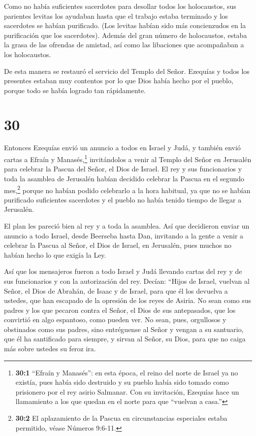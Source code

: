  Como no había suficientes sacerdotes para desollar todos
los holocaustos, sus parientes levitas los ayudaban hasta que el trabajo
estaba terminado y los sacerdotes se habían purificado. (Los levitas
habían sido más concienzudos en la purificación que los sacerdotes).
 Además del gran número de holocaustos, estaba la grasa de
las ofrendas de amistad, así como las libaciones que acompañaban a los
holocaustos.

De esta manera se restauró el servicio del Templo del Señor.
 Ezequías y todos los presentes estaban muy contentos por
lo que Dios había hecho por el pueblo, porque todo se había logrado tan
rápidamente.

\hypertarget{section-29}{%
\section{30}\label{section-29}}

 Entonces Ezequías envió un anuncio a todos en Israel y
Judá, y también envió cartas a Efraín y Manasés,\footnote{\textbf{30:1}
  ``Efraín y Manasés'': en esta época, el reino del norte de Israel ya
  no existía, pues había sido destruido y su pueblo había sido tomado
  como prisionero por el rey asirio Salmanar. Con su invitación,
  Ezequías hace un llamamiento a los que quedan en el norte para que
  ``vuelvan a casa.''} invitándolos a venir al Templo del Señor en
Jerusalén para celebrar la Pascua del Señor, el Dios de Israel.
 El rey y sus funcionarios y toda la asamblea de Jerusalén
habían decidido celebrar la Pascua en el segundo mes,\footnote{\textbf{30:2}
  El aplazamiento de la Pascua en circunstancias especiales estaba
  permitido, véase Números 9:6-11.}  porque no habían podido
celebrarlo a la hora habitual, ya que no se habían purificado
suficientes sacerdotes y el pueblo no había tenido tiempo de llegar a
Jerusalén.

 El plan les pareció bien al rey y a toda la asamblea.
 Así que decidieron enviar un anuncio a todo Israel, desde
Beerseba hasta Dan, invitando a la gente a venir a celebrar la Pascua al
Señor, el Dios de Israel, en Jerusalén, pues muchos no habían hecho lo
que exigía la Ley.

 Así que los mensajeros fueron a todo Israel y Judá llevando
cartas del rey y de sus funcionarios y con la autorización del rey.
Decían: ``Hijos de Israel, vuelvan al Señor, el Dios de Abrahán, de
Isaac y de Israel, para que él los devuelva a ustedes, que han escapado
de la opresión de los reyes de Asiria.  No sean como sus
padres y los que pecaron contra el Señor, el Dios de sus antepasados,
que los convirtió en algo espantoso, como pueden ver.  No
sean, pues, orgullosos y obstinados como sus padres, sino entréguense al
Señor y vengan a su santuario, que él ha santificado para siempre, y
sirvan al Señor, su Dios, para que no caiga más sobre ustedes su feroz
ira.


